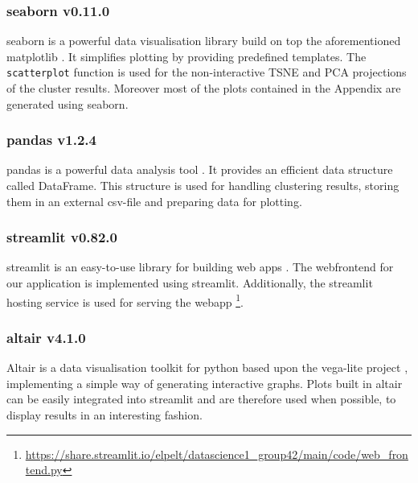 \subsubsection[seaborn]{seaborn v0.11.0}
seaborn is a powerful data visualisation library build on top the aforementioned matplotlib \cite{seaborn}. It simplifies plotting by providing predefined templates. The \texttt{scatterplot} function is used for the non-interactive TSNE and PCA projections of the cluster results. Moreover most of the plots contained in the Appendix are generated using seaborn.

\subsubsection[pandas]{pandas v1.2.4}
pandas is a powerful data analysis tool \cite{mckinney-proc-scipy-2010, reback2020pandas}. It provides an efficient data structure called DataFrame. This structure is used for handling clustering results, storing them in an external csv-file and preparing data for plotting. 

\subsubsection[streamlit]{streamlit v0.82.0}
streamlit is an easy-to-use library for building web apps \cite{streamlit}. The webfrontend for our application is implemented using streamlit. Additionally, the streamlit hosting service is used for serving the webapp \footnote{\url{https://share.streamlit.io/elpelt/datascience1_group42/main/code/web_frontend.py}}.

\subsubsection[altair]{altair v4.1.0} \label{altair}
Altair \cite{VanderPlas2018} is a data visualisation toolkit for python based upon the vega-lite project \cite{Satyanarayan2017}, implementing a simple way of generating interactive graphs. Plots built in altair can be easily integrated into streamlit and are therefore used when possible, to display results in an interesting fashion.
